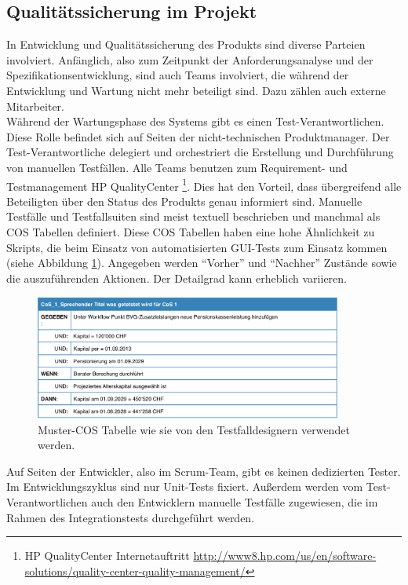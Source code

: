 \subsection{Qualitätssicherung im Projekt}
\label{sec:quality_project}
In Entwicklung und Qualitätssicherung des Produkts sind diverse Parteien involviert. Anfänglich, also zum Zeitpunkt der Anforderungsanalyse und der Spezifikationsentwicklung, sind auch Teams involviert, die während der Entwicklung und Wartung nicht mehr beteiligt sind. Dazu zählen auch externe Mitarbeiter.\\
Während der Wartungsphase des Systems gibt es einen Test-Verantwortlichen. Diese Rolle befindet sich auf Seiten der nicht-technischen Produktmanager. Der Test-Verantwortliche delegiert und orchestriert die Erstellung und Durchführung von manuellen Testfällen. Alle Teams benutzen zum Requirement- und Testmanagement HP QualityCenter \footnote{HP QualityCenter Internetauftritt \url{http://www8.hp.com/us/en/software-solutions/quality-center-quality-management/}}. Dies hat den Vorteil, dass übergreifend alle Beteiligten über den Status des Produkts genau informiert sind. Manuelle Testfälle und Testfallsuiten sind meist textuell beschrieben und manchmal als \gls{COS} Tabellen definiert. Diese \gls{COS} Tabellen haben eine hohe Ähnlichkeit zu Skripts, die beim Einsatz von automatisierten GUI-Tests zum Einsatz kommen (siehe Abbildung \ref{fig:cos_raiffeisen}). Angegeben werden ``Vorher'' und ``Nachher'' Zustände sowie die auszuführenden Aktionen. Der Detailgrad kann erheblich variieren.

\begin{figure}[h] 
  \centering
     \includegraphics[width=0.9\textwidth]{figures/cos_raiffeisen.png}
  \caption{Muster-COS Tabelle wie sie von den Testfalldesignern verwendet werden.}
  \label{fig:cos_raiffeisen}
\end{figure}


Auf Seiten der Entwickler, also im Scrum-Team, gibt es keinen dedizierten Tester. Im Entwicklungszyklus sind nur Unit-Tests fixiert. Außerdem werden vom Test-Verantwortlichen auch den Entwicklern manuelle Testfälle zugewiesen, die im Rahmen des Integrationstests durchgeführt werden.

